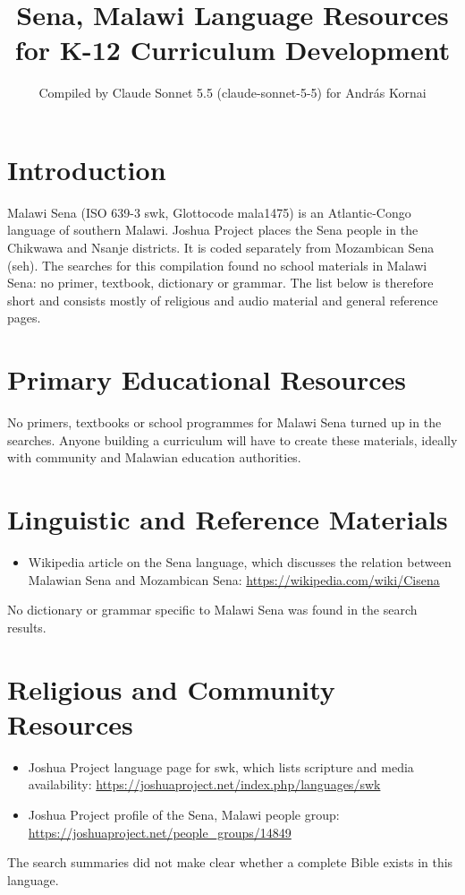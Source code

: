 \documentclass[12pt]{article}
\title{Sena, Malawi Language Resources for K-12 Curriculum Development}
\author{Compiled by Claude Sonnet 5.5 (claude-sonnet-5-5) for Andr\'as Kornai}
\date{}
\begin{document}
\maketitle

\section{Introduction}
Malawi Sena (ISO 639-3 swk, Glottocode mala1475) is an Atlantic-Congo language of southern Malawi. Joshua Project places the Sena people in the Chikwawa and Nsanje districts. It is coded separately from Mozambican Sena (seh). The searches for this compilation found no school materials in Malawi Sena: no primer, textbook, dictionary or grammar. The list below is therefore short and consists mostly of religious and audio material and general reference pages.

\section{Primary Educational Resources}
No primers, textbooks or school programmes for Malawi Sena turned up in the searches. Anyone building a curriculum will have to create these materials, ideally with community and Malawian education authorities.

\section{Linguistic and Reference Materials}
\begin{itemize}
\item Wikipedia article on the Sena language, which discusses the relation between Malawian Sena and Mozambican Sena: \url{https://wikipedia.com/wiki/Cisena}
\end{itemize}
No dictionary or grammar specific to Malawi Sena was found in the search results.

\section{Religious and Community Resources}
\begin{itemize}
\item Joshua Project language page for swk, which lists scripture and media availability: \url{https://joshuaproject.net/index.php/languages/swk}
\item Joshua Project profile of the Sena, Malawi people group: \url{https://joshuaproject.net/people_groups/14849}
\end{itemize}
The search summaries did not make clear whether a complete Bible exists in this language.
\end{document}
